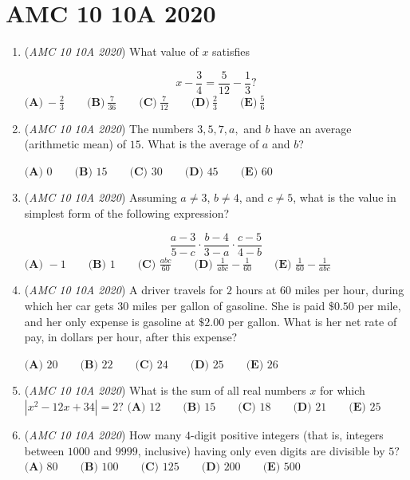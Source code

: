 \section{AMC 10 10A 2020}
        \begin{enumerate}
        	\item (\textit{AMC 10 10A 2020}) What value of $x$ satisfies

 \[x- \frac{3}{4} = \frac{5}{12} - \frac{1}{3}?\]
$\textbf{(A)}\ {-}\frac{2}{3}\qquad\textbf{(B)}\ \frac{7}{36}\qquad\textbf{(C)}\ \frac{7}{12}\qquad\textbf{(D)}\ \frac{2}{3}\qquad\textbf{(E)}\ \frac{5}{6}$


	\item (\textit{AMC 10 10A 2020}) The numbers $3, 5, 7, a,$ and $b$ have an average (arithmetic mean) of $15$. What is the average of $a$ and $b$?


 $\textbf{(A) } 0 \qquad\textbf{(B) } 15 \qquad\textbf{(C) } 30 \qquad\textbf{(D) } 45 \qquad\textbf{(E) } 60$


	\item (\textit{AMC 10 10A 2020}) Assuming $a\neq3$, $b\neq4$, and $c\neq5$, what is the value in simplest form of the following expression?

 \[\frac{a-3}{5-c} \cdot \frac{b-4}{3-a} \cdot \frac{c-5}{4-b}\]
$\textbf{(A) } {-}1 \qquad \textbf{(B) } 1 \qquad \textbf{(C) } \frac{abc}{60} \qquad \textbf{(D) } \frac{1}{abc} - \frac{1}{60} \qquad \textbf{(E) } \frac{1}{60} - \frac{1}{abc}$


	\item (\textit{AMC 10 10A 2020}) A driver travels for $2$ hours at $60$ miles per hour, during which her car gets $30$ miles per gallon of gasoline. She is paid $\$0.50$ per mile, and her only expense is gasoline at $\$2.00$ per gallon. What is her net rate of pay, in dollars per hour, after this expense?


 $\textbf{(A) }20 \qquad\textbf{(B) }22 \qquad\textbf{(C) }24 \qquad\textbf{(D) } 25\qquad\textbf{(E) } 26$


	\item (\textit{AMC 10 10A 2020}) What is the sum of all real numbers $x$ for which $|x^2-12x+34|=2?$
$\textbf{(A) } 12 \qquad \textbf{(B) } 15 \qquad \textbf{(C) } 18 \qquad \textbf{(D) } 21 \qquad \textbf{(E) } 25$


	\item (\textit{AMC 10 10A 2020}) How many $4$-digit positive integers (that is, integers between $1000$ and $9999$, inclusive) having only even digits are divisible by $5?$
$\textbf{(A) } 80 \qquad \textbf{(B) } 100 \qquad \textbf{(C) } 125 \qquad \textbf{(D) } 200 \qquad \textbf{(E) } 500$



\end{enumerate}
